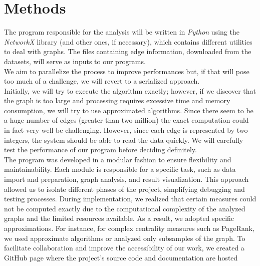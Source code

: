 \documentclass{article}
\begin{document}
\section{Methods}
The program responsible for the analysis will be written in \textit{Python} using the \textit{NetworkX} library (and other ones, if necessary), which contains different utilities to deal with graphs. The files containing edge information, downloaded from the datasets, will serve as inputs to our programs. \\
We aim to parallelize the process to improve performances but, if that will pose too much of a challenge, we will revert to a serialized approach.\\
Initially, we will try to execute the algorithm exactly; however, if we discover that the graph is too large and processing requires excessive time and memory consumption, we will try to use approximated algorithms. Since there seem to be a huge number of edges (greater than two million) the exact computation could in fact very well be challenging. However, since each edge is represented by two integers, the system should be able to read the data quickly. We will carefully test the performance of our program before deciding definitely. \\

The program was developed in a modular fashion to ensure flexibility and maintainability. Each module is responsible for a specific task, such as data import and preparation, graph analysis, and result visualization. This approach allowed us to isolate different phases of the project, simplifying debugging and testing processes. During implementation, we realized that certain measures could not be computed exactly due to the computational complexity of the analyzed graphs and the limited resources available. As a result, we adopted specific approximations.
For instance, for complex centrality measures such as PageRank, we used approximate algorithms or analyzed only subsamples of the graph. To facilitate collaboration and improve the accessibility of our work, we created a GitHub page where the project’s source code and documentation are hosted \\
\end{document}
